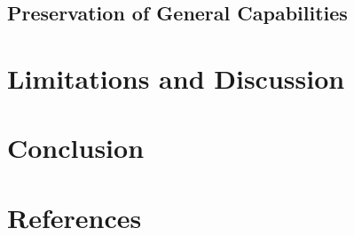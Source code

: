 \documentclass{article}
\begin{document}
\subsection{Preservation of General Capabilities}
\label{sec:analysis:forgetting}



\section{Limitations and Discussion}
\label{sec:limitations}



\section{Conclusion}
\label{sec:conclusion}




% 

\section*{References}
\end{document}
